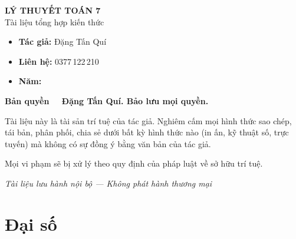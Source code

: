 \documentclass[12pt,a4paper]{article}
\begin{document}
\newpage

\thispagestyle{empty}
\vspace*{5cm}
\begin{center}
  {\Large\bfseries LÝ THUYẾT TOÁN 7}\\[8pt]
  {\large Tài liệu tổng hợp kiến thức}
\end{center}

\vspace{2cm}

\begin{tcolorbox}[
  enhanced, colback=red!3!white, colframe=red!60!black,
  fonttitle=\bfseries, title={Thông tin bản quyền},
  boxrule=1.5pt
]
  \begin{itemize}[leftmargin=*]
    \item \textbf{Tác giả:} Đặng Tấn Quí
    \item \textbf{Liên hệ:} 0377\,122\,210
    \item \textbf{Năm:} \the\year
  \end{itemize}

  \vspace{8pt}
  \textbf{Bản quyền \textcopyright\ \the\year\ Đặng Tấn Quí. Bảo lưu mọi quyền.}

  \vspace{6pt}
  Tài liệu này là tài sản trí tuệ của tác giả. Nghiêm cấm mọi hình thức sao chép, tái bản, phân phối, chia sẻ dưới bất kỳ hình thức nào (in ấn, kỹ thuật số, trực tuyến) mà không có sự đồng ý bằng văn bản của tác giả.

  \vspace{6pt}
  Mọi vi phạm sẽ bị xử lý theo quy định của pháp luật về sở hữu trí tuệ.
\end{tcolorbox}

\vfill
\begin{center}
  \small\textit{Tài liệu lưu hành nội bộ --- Không phát hành thương mại}
\end{center}

\newpage

\tableofcontents
\newpage

\section{Đại số}
\end{document}
